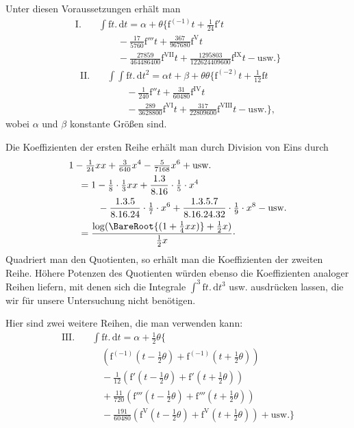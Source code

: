\par Unter diesen Voraussetzungen erhält man
\[
\begin{aligned}
\mathrm{I.}\quad&\int\mathrm{f}t.\,\mathrm{d}t=\alpha+\theta\bigl\{\mathrm{f}^{(-1)}t+\tfrac1{24}\mathrm{f}'t\\
&\qquad-\tfrac{17}{5760}\mathrm{f}'''t+\tfrac{367}{967680}\mathrm{f}^{\mathrm{V}}t\\
&\qquad-\tfrac{27859}{464486400}\mathrm{f}^{\mathrm{VII}}t+\tfrac{1295803}{122624409600}\mathrm{f}^{\mathrm{IX}}t-\text{usw.}\bigr\}
\end{aligned}
\]
\[
\begin{aligned}
\mathrm{II.}\quad&\int\!\int\mathrm{f}t.\,\mathrm{d}t^2=\alpha t+\beta+\theta\theta\bigl\{\mathrm{f}^{(-2)}t+\tfrac1{12}\mathrm{f}t\\
&\qquad-\tfrac1{240}\mathrm{f}''t+\tfrac{31}{60480}\mathrm{f}^{\mathrm{IV}}t\\
&\qquad-\tfrac{289}{3628800}\mathrm{f}^{\mathrm{VI}}t+\tfrac{317}{22809600}\mathrm{f}^{\mathrm{VIII}}t-\text{usw.}\bigr\},
\end{aligned}
\]
wobei \(\alpha\) und \(\beta\) konstante Größen sind.
\par Die Koeffizienten der ersten Reihe erhält man durch Division von Eins durch
\[
\begin{aligned}
&1-\tfrac1{24}xx+\tfrac3{640}x^4-\tfrac5{7168}x^6+\text{usw.}\\
&\quad=1-\tfrac18\cdot\tfrac13xx+\dfrac{1.3}{8.16}\cdot\tfrac15\cdot x^4\\
&\qquad\quad-\dfrac{1.3.5}{8.16.24}\cdot\tfrac17\cdot x^6+\dfrac{1.3.5.7}{8.16.24.32}\cdot\tfrac19\cdot x^8-\text{usw.}\\
&\quad=\dfrac{\log(\BareRoot{(1+\tfrac14xx)}+\tfrac12x)}{\tfrac12x}\mathpunct{\cdot}
\end{aligned}
\]
Quadriert man den Quotienten, so erhält man die Koeffizienten der zweiten Reihe. Höhere Potenzen des Quotienten würden ebenso die Koeffizienten analoger Reihen liefern, mit denen sich die Integrale \(\int^3\mathrm{f}t.\,\mathrm{d}t^3\) usw. ausdrücken lassen, die wir für unsere Untersuchung nicht benötigen.
\par Hier sind zwei weitere Reihen, die man verwenden kann:
\[
\begin{aligned}
\mathrm{III.}\quad&\int\mathrm{f}t.\,\mathrm{d}t=\alpha+\tfrac12\theta\bigl\{\\
&\quad(\mathrm{f}^{(-1)}(t-\tfrac12\theta)+\mathrm{f}^{(-1)}(t+\tfrac12\theta))\\
&\quad-\tfrac1{12}(\mathrm{f}'(t-\tfrac12\theta)+\mathrm{f}'(t+\tfrac12\theta))\\
&\quad+\tfrac{11}{720}(\mathrm{f}'''(t-\tfrac12\theta)+\mathrm{f}'''(t+\tfrac12\theta))\\
&\quad-\tfrac{191}{60480}(\mathrm{f}^{\mathrm{V}}(t-\tfrac12\theta)+\mathrm{f}^{\mathrm{V}}(t+\tfrac12\theta))+\text{usw.}\bigr\}
\end{aligned}
\]

